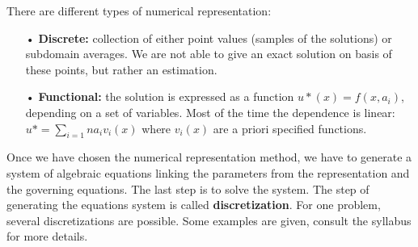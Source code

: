 There are different types of numerical representation:

\begin{itemize}
\item[•] \textbf{Discrete:} collection of either point values (samples of the solutions) or subdomain averages. We are not able to give an exact solution on basis of these points, but rather an estimation.
\item[•] \textbf{Functional:} the solution is expressed as a function $u*(x) = f(x,a_i)$, depending on a set of variables. Most of the time the dependence is linear: $u* = \sum_{i=1}n a_i v_i(x)$ where $v_i(x)$ are a priori specified functions. \\
\end{itemize}

Once we have chosen the numerical representation method, we have to generate a system of algebraic equations linking the parameters from the representation and the governing equations. The last step is to solve the system. The step of generating the equations system is called \textbf{discretization}. For one problem, several discretizations are possible. Some examples are given, consult the syllabus for more details. 
